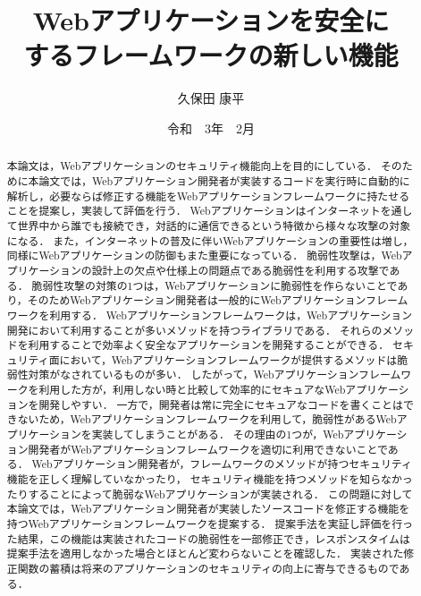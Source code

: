 \documentclass[a4paper,12pt]{jreport}
\title{Webアプリケーションを安全に\\するフレームワークの新しい機能}
\author{久保田 康平}
\date{令和　3年　2月}
\begin{document}
\maketitle

\begin{abstract}
本論文は，Webアプリケーションのセキュリティ機能向上を目的にしている．
そのために本論文では，Webアプリケーション開発者が実装するコードを実行時に自動的に解析し，必要ならば修正する機能をWebアプリケーションフレームワークに持たせることを提案し，実装して評価を行う．
Webアプリケーションはインターネットを通して世界中から誰でも接続でき，対話的に通信できるという特徴から様々な攻撃の対象になる．
また，インターネットの普及に伴いWebアプリケーションの重要性は増し，同様にWebアプリケーションの防御もまた重要になっている．
脆弱性攻撃は，Webアプリケーションの設計上の欠点や仕様上の問題点である脆弱性を利用する攻撃である．
脆弱性攻撃の対策の1つは，Webアプリケーションに脆弱性を作らないことであり，そのためWebアプリケーション開発者は一般的にWebアプリケーションフレームワーク\cite{ref:bottle}\cite{ref:flask}\cite{ref:django}を利用する．
Webアプリケーションフレームワークは，Webアプリケーション開発において利用することが多いメソッドを持つライブラリである．
それらのメソッドを利用することで効率よく安全なアプリケーションを開発することができる．
セキュリティ面において，Webアプリケーションフレームワークが提供するメソッドは脆弱性対策がなされているものが多い．
したがって，Webアプリケーションフレームワークを利用した方が，利用しない時と比較して効率的にセキュアなWebアプリケーションを開発しやすい．
一方で，開発者は常に完全にセキュアなコードを書くことはできないため，Webアプリケーションフレームワークを利用して，脆弱性があるWebアプリケーションを実装してしまうことがある．
その理由の1つが，Webアプリケーション開発者がWebアプリケーションフレームワークを適切に利用できないことである．
Webアプリケーション開発者が，フレームワークのメソッドが持つセキュリティ機能を正しく理解していなかったり，
セキュリティ機能を持つメソッドを知らなかったりすることによって脆弱なWebアプリケーションが実装される．
この問題に対して本論文では，Webアプリケーション開発者が実装したソースコードを修正する機能を持つWebアプリケーションフレームワークを提案する．
提案手法を実証し評価を行った結果，この機能は実装されたコードの脆弱性を一部修正でき，レスポンスタイムは提案手法を適用しなかった場合とほとんど変わらないことを確認した．
実装された修正関数の蓄積は将来のアプリケーションのセキュリティの向上に寄与できるものである．
\end{abstract}

\tableofcontents
\listoffigures
\newpage
{}
\end{document}
